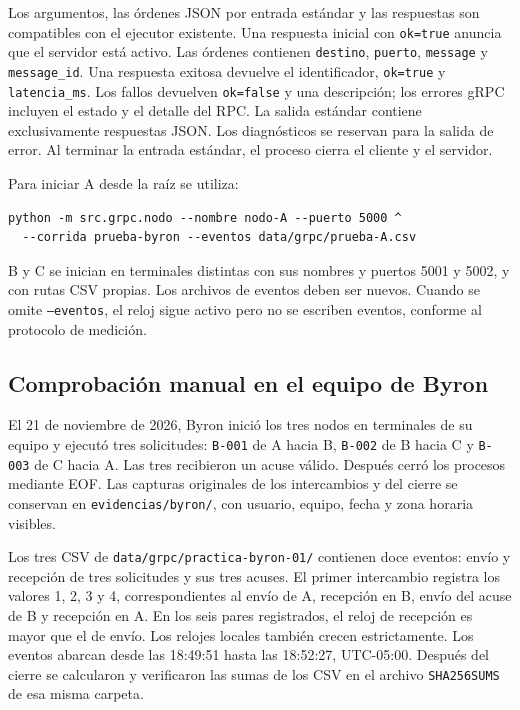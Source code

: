 Los argumentos, las órdenes JSON por entrada estándar y las respuestas
son compatibles con el ejecutor existente. Una respuesta inicial con
\texttt{ok=true} anuncia que el servidor está activo. Las órdenes contienen
\texttt{destino}, \texttt{puerto}, \texttt{message} y \texttt{message\_id}.
Una respuesta exitosa devuelve el identificador, \texttt{ok=true} y
\texttt{latencia\_ms}. Los fallos devuelven \texttt{ok=false} y una
descripción; los errores gRPC incluyen el estado y el detalle del RPC.
La salida estándar contiene exclusivamente respuestas JSON. Los
diagnósticos se reservan para la salida de error. Al terminar la entrada
estándar, el proceso cierra el cliente y el servidor.

Para iniciar A desde la raíz se utiliza:

\begin{verbatim}
python -m src.grpc.nodo --nombre nodo-A --puerto 5000 ^
  --corrida prueba-byron --eventos data/grpc/prueba-A.csv
\end{verbatim}

B y C se inician en terminales distintas con sus nombres y puertos
5001 y 5002, y con rutas CSV propias. Los archivos de eventos deben ser
nuevos. Cuando se omite \texttt{--eventos}, el reloj sigue activo pero
no se escriben eventos, conforme al protocolo de medición.

\subsection{Comprobación manual en el equipo de Byron}

El 21 de noviembre de 2026, Byron inició los tres nodos en terminales
de su equipo y ejecutó tres solicitudes: \texttt{B-001} de A hacia B,
\texttt{B-002} de B hacia C y \texttt{B-003} de C hacia A. Las tres
recibieron un acuse válido. Después cerró los procesos mediante EOF.
Las capturas originales de los intercambios y del cierre se conservan
en \texttt{evidencias/byron/}, con usuario, equipo, fecha y zona horaria
visibles.

Los tres CSV de \texttt{data/grpc/practica-byron-01/} contienen doce
eventos: envío y recepción de tres solicitudes y sus tres acuses.
El primer intercambio registra los valores 1, 2, 3 y 4, correspondientes
al envío de A, recepción en B, envío del acuse de B y recepción en A.
En los seis pares registrados, el reloj de recepción es mayor que el
de envío. Los relojes locales también crecen estrictamente.
Los eventos abarcan desde las 18:49:51 hasta las 18:52:27, UTC-05:00.
Después del cierre se calcularon y verificaron las sumas de los CSV
en el archivo \texttt{SHA256SUMS} de esa misma carpeta.

